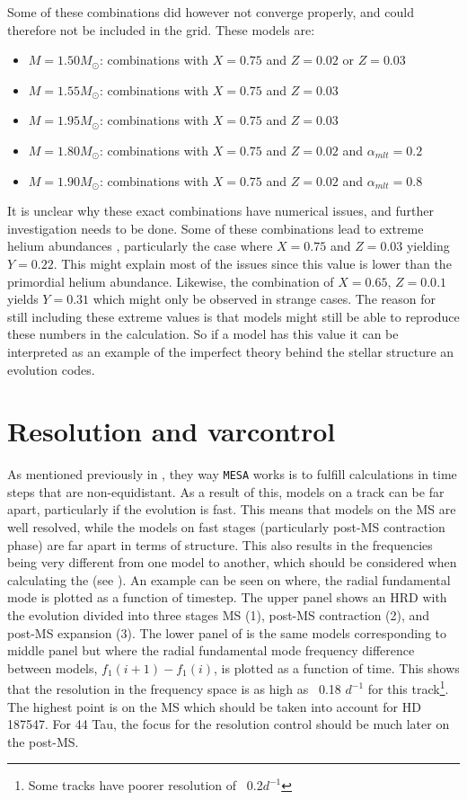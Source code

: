 Some of these combinations did however not converge properly, and could therefore not be included in the grid. These models are:
\begin{itemize}
	\item $M=1.50M_\odot$: combinations with $X=0.75$ and $Z=0.02$ or $Z=0.03$
	\item $M=1.55M_\odot$: combinations with $X=0.75$ and $Z=0.03$
	\item $M=1.95M_\odot$: combinations with $X=0.75$ and $Z=0.03$
	\item $M=1.80M_\odot$: combinations with $X=0.75$ and $Z=0.02$ and $\alpha_{mlt} = 0.2$
	\item $M=1.90M_\odot$: combinations with $X=0.75$ and $Z=0.02$ and $\alpha_{mlt} = 0.8$ 
\end{itemize}

It is unclear why these exact combinations have numerical issues, and further investigation needs to be done. Some of these combinations lead to extreme helium abundances , particularly the case where $X=0.75$ and $Z=0.03$ yielding $Y=0.22$. This might explain most of the issues since this value is lower than the primordial helium abundance. Likewise, the combination of  $X=0.65$, $Z=0.0.1$ yields $Y=0.31$ which might only be observed in strange cases. The reason for still including these extreme values is that models might still be able to reproduce these numbers in the calculation. So if a model has this value it can be interpreted as an example of the imperfect theory behind the stellar structure an evolution codes.  

\section{Resolution and varcontrol}
\label{sec:res}

As mentioned previously in , they way \texttt{MESA} works is to fulfill calculations in time steps that are non-equidistant. As a result of this, models on a track can be far apart, particularly if the evolution is fast. This means that models on the MS are well resolved, while the models on fast stages (particularly post-MS contraction phase) are far apart in terms of structure. This also results in the frequencies being very different from one model to another, which should be considered when calculating the \chis (see ). An example can be seen on  where, the radial fundamental mode is plotted as a function of timestep. The upper panel shows an HRD with the evolution divided into three stages MS (1), post-MS contraction (2), and post-MS expansion (3). The lower panel of  is the same models corresponding to middle panel but where the radial fundamental mode frequency difference between models, $f_1(i+1) - f_1(i)$, is plotted as a function of time. This shows that the resolution in the frequency space is as high as ~0.18 $d^{-1}$ for this track\footnote{Some tracks have poorer resolution of ~0.2$d^{-1}$}. The highest point is on the MS which should be taken into account for HD 187547. For 44 Tau, the focus for the resolution control should be much later on the post-MS.      

